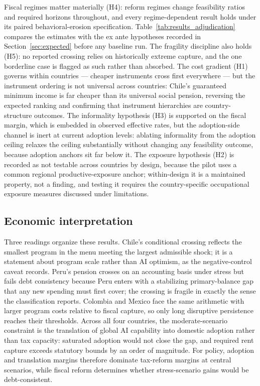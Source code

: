 \documentclass[11pt,a4paper]{article}
\begin{document}
Fiscal regimes matter materially (H4): reform regimes change
feasibility ratios and required horizons throughout, and every regime-dependent result holds
under its paired behavioral-erosion specification. Table~\ref{tab:results_adjudication}
compares the estimates with the ex ante hypotheses recorded in Section~\ref{sec:expected}
before any baseline run. The fragility discipline also holds
(H5): no reported crossing relies on historically extreme capture, and the one borderline
case is flagged as such rather than absorbed. The cost gradient (H1) governs within countries --- cheaper
instruments cross first everywhere --- but the instrument ordering is not universal across
countries: Chile's guaranteed minimum income is far cheaper than its universal social pension,
reversing the expected ranking and confirming that instrument hierarchies are
country-structure outcomes. The informality hypothesis (H3) is supported on the fiscal
margin, which is embedded in observed effective rates, but the adoption-side channel is
inert at current adoption levels: ablating informality from the adoption ceiling relaxes
the ceiling substantially without changing any feasibility outcome, because adoption
anchors sit far below it. The exposure hypothesis (H2) is recorded as not testable
across countries by design, because the pilot uses a common regional productive-exposure
anchor; within-design it is a maintained property, not a finding, and testing it requires
the country-specific occupational exposure measures discussed under limitations.



\subsection{Economic interpretation}

Three readings organize these results. Chile's conditional crossing reflects the smallest program in the menu meeting the largest admissible shock; it is a statement about program scale rather than AI optimism, as the negative-control caveat records. Peru's pension crosses on an accounting basis under stress but fails debt consistency because Peru enters with a stabilizing primary-balance gap that any new spending must first cover; the crossing is fragile in exactly the sense the classification reports. Colombia and Mexico face the same arithmetic with larger program costs relative to fiscal capture, so only long disruptive persistence reaches their thresholds. Across all four countries, the moderate-scenario constraint is the translation of global AI capability into domestic adoption rather than tax capacity: saturated adoption would not close the gap, and required rent capture exceeds statutory bounds by an order of magnitude. For policy, adoption and translation margins therefore dominate tax-reform margins at central scenarios, while fiscal reform determines whether stress-scenario gains would be debt-consistent.
\end{document}
